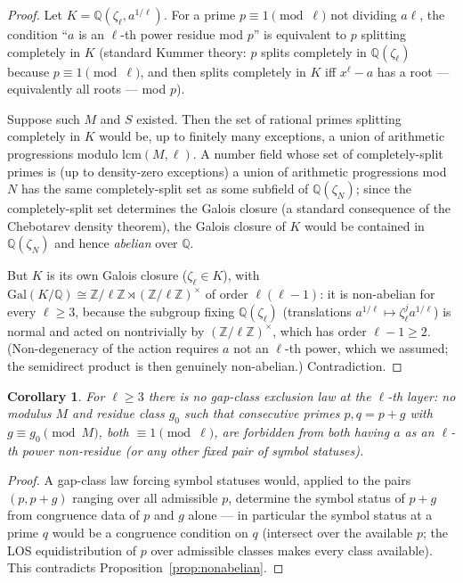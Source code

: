 \documentclass[11pt,reqno]{amsart}
\theoremstyle{plain}
\newtheorem{corollary}[theorem]{Corollary}
\theoremstyle{definition}
\newcommand{\Z}{\mathbb{Z}}
\newcommand{\Q}{\mathbb{Q}}
\begin{document}
\begin{proof}
Let $K = \Q(\zeta_\ell, a^{1/\ell})$. For a prime
$p \equiv 1 \pmod \ell$ not dividing $a\ell$, the condition ``$a$ is an
$\ell$-th power residue mod $p$'' is equivalent to $p$ splitting completely
in $K$ (standard Kummer theory: $p$ splits completely in $\Q(\zeta_\ell)$
because $p \equiv 1 \pmod \ell$, and then splits completely in $K$ iff
$x^\ell - a$ has a root --- equivalently all roots --- mod $p$).

Suppose such $M$ and $S$ existed. Then the set of rational primes splitting
completely in $K$ would be, up to finitely many exceptions, a union of
arithmetic progressions modulo $\mathrm{lcm}(M, \ell)$. A number field whose
set of completely-split primes is (up to density-zero exceptions) a union of
arithmetic progressions mod $N$ has the same completely-split set as some
subfield of $\Q(\zeta_N)$; since the completely-split set determines the
Galois closure (a standard consequence of the Chebotarev density theorem),
the Galois closure of $K$ would be contained in $\Q(\zeta_N)$ and hence
\emph{abelian} over $\Q$.

But $K$ is its own Galois closure ($\zeta_\ell \in K$), with
$\mathrm{Gal}(K/\Q) \cong \Z/\ell\Z \rtimes (\Z/\ell\Z)^\times$ of order
$\ell(\ell-1)$: it is non-abelian for every $\ell \ge 3$, because the
subgroup fixing $\Q(\zeta_\ell)$ (translations $a^{1/\ell} \mapsto
\zeta_\ell^j a^{1/\ell}$) is normal and acted on nontrivially by
$(\Z/\ell\Z)^\times$, which has order $\ell - 1 \ge 2$. (Non-degeneracy of
the action requires $a$ not an $\ell$-th power, which we assumed; the
semidirect product is then genuinely non-abelian.) Contradiction.
\end{proof}

\begin{corollary}
\label{cor:noexclusion}
For $\ell \ge 3$ there is no gap-class exclusion law at the $\ell$-th layer:
no modulus $M$ and residue class $g_0$ such that consecutive primes
$p, q = p + g$ with $g \equiv g_0 \pmod M$, both $\equiv 1 \pmod \ell$, are
forbidden from both having $a$ as an $\ell$-th power non-residue (or any
other fixed pair of symbol statuses).
\end{corollary}

\begin{proof}
A gap-class law forcing symbol statuses would, applied to the pairs
$(p, p+g)$ ranging over all admissible $p$, determine the symbol status of
$p + g$ from congruence data of $p$ and $g$ alone --- in particular the
symbol status at a prime $q$ would be a congruence condition on $q$
(intersect over the available $p$; the LOS equidistribution of $p$ over
admissible classes makes every class available). This contradicts
Proposition~\ref{prop:nonabelian}.
\end{proof}
\end{document}

